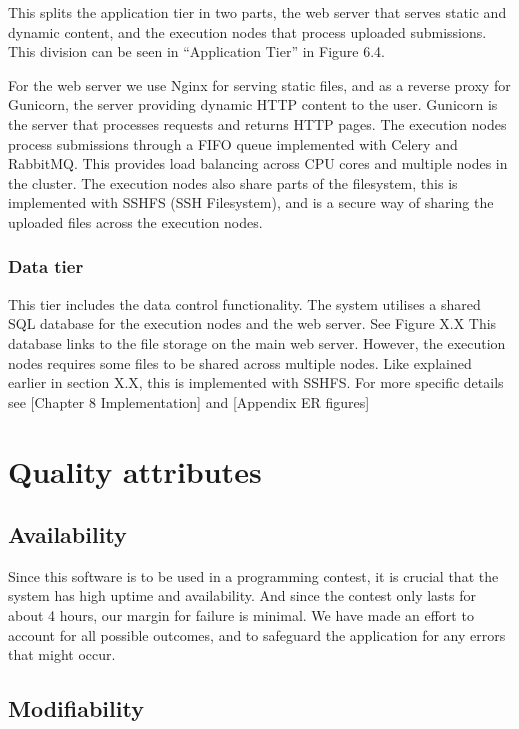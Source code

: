 This splits the application tier in two parts, the web server that
serves static and dynamic content, and the execution nodes that process
uploaded submissions. This division can be seen in
{\textquotedblleft}Application Tier{\textquotedblright} in Figure 6.4.


For the web server we use Nginx for serving static files, and as a
reverse proxy for Gunicorn, the server providing dynamic HTTP content
to the user. Gunicorn is the server that processes requests and returns
HTTP pages. The execution nodes process submissions through a FIFO
queue implemented with Celery and RabbitMQ. This provides load
balancing across CPU cores and multiple nodes in the cluster. The
execution nodes also share parts of the filesystem, this is implemented
with SSHFS (SSH Filesystem), and is a secure way of sharing the
uploaded files across the execution nodes. 


\subsubsection{Data tier}

This tier includes the data control functionality. The system utilises a
shared SQL database for the execution nodes and the web server. See
Figure X.X This database links to the file storage on the main web
server. However, the execution nodes requires some files to be shared
across multiple nodes. Like explained earlier in section X.X, this is
implemented with SSHFS. For more specific details see [Chapter 8
Implementation] and [Appendix ER figures]


\section{Quality attributes}

\subsection{Availability}

Since this software is to be used in a programming contest, it is
crucial that the system has high uptime and availability. And since the
contest only lasts for about 4 hours, our margin for failure is
minimal. We have made an effort to account for all possible outcomes,
and to safeguard the application for any errors that might occur. 

\subsection{Modifiability}


